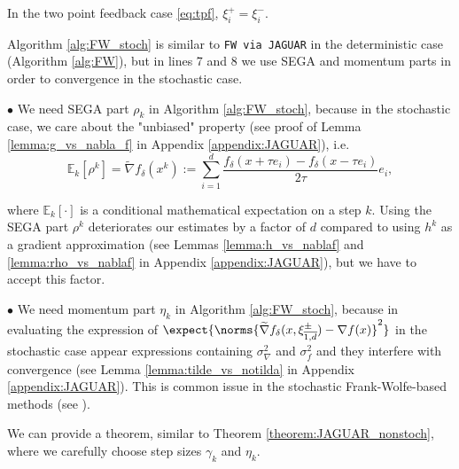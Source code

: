         In the two point feedback case \eqref{eq:tpf}, $\xi_i^+ = \xi_i^-$.
    
        Algorithm \ref{alg:FW_stoch} is similar to \texttt{FW via JAGUAR} in the deterministic case (Algorithm \ref{alg:FW}), but in lines 7 and 8 we use SEGA \cite{hanzely2018sega} and  momentum \cite{mokhtari2020stochastic} parts in order to convergence in the stochastic case. 

        $\bullet$ We need SEGA part \cite{hanzely2018sega} $\rho_k$ in Algorithm \ref{alg:FW_stoch}, because in the stochastic case, we care about the "unbiased" property (see proof of Lemma \ref{lemma:g_vs_nabla_f} in Appendix \ref{appendix:JAGUAR}), i.e. 
        \vspace{-0.2cm}
        $$\mathbb{E}_{k}[\rho^k] = \widetilde{\nabla} f_\delta(x^k) := \sum\limits_{i = 1}^{d} \frac{f_\delta (x + \tau e_i) - f_\delta(x - \tau e_i)}{2 \tau} e_i,$$

        where $\mathbb{E}_{k}[\cdot]$ is a conditional mathematical expectation on a step $k$. Using the SEGA part $\rho^k$ deteriorates our estimates by a factor of $d$ compared to using $h^k$ as a gradient approximation (see Lemmas \ref{lemma:h_vs_nablaf} and \ref{lemma:rho_vs_nablaf} in Appendix \ref{appendix:JAGUAR}), but we have to accept this factor.

        $\bullet$
        We need momentum part \cite{mokhtari2020stochastic} $\eta_k$ in Algorithm \ref{alg:FW_stoch}, because in evaluating the expression of $\expect{\norms{\widetilde{\nabla}f_{\delta}(x, \xi_{\overline{1, d}}^\pm) - \nabla f(x)}^2}$ in the stochastic case appear expressions containing $\sigma_\nabla^2$ and $\sigma_f^2$ and they interfere with convergence (see Lemma \ref{lemma:tilde_vs_notilda} in Appendix \ref{appendix:JAGUAR}). This is common issue in the stochastic Frank-Wolfe-based methods (see \cite{mokhtari2020stochastic}). 

        We can provide a theorem, similar to Theorem \ref{theorem:JAGUAR_nonstoch}, where we carefully choose step sizes $\gamma_k$ and $\eta_k$. 
    
